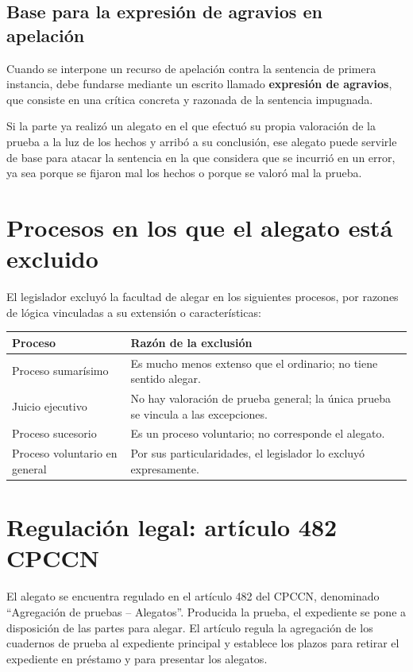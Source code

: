 \documentclass[12pt,oneside]{book}
\begin{document}
\subsection{Base para la expresión de agravios en apelación}

Cuando se interpone un recurso de apelación contra la sentencia de primera instancia, debe fundarse mediante un escrito llamado \textbf{expresión de agravios}, que consiste en una crítica concreta y razonada de la sentencia impugnada.

Si la parte ya realizó un alegato en el que efectuó su propia valoración de la prueba a la luz de los hechos y arribó a su conclusión, ese alegato puede servirle de base para atacar la sentencia en la que considera que se incurrió en un error, ya sea porque se fijaron mal los hechos o porque se valoró mal la prueba.

\section{Procesos en los que el alegato está excluido}

El legislador excluyó la facultad de alegar en los siguientes procesos, por razones de lógica vinculadas a su extensión o características:

\begin{table}[H]
\centering
\begin{tabularx}{\textwidth}{>{\raggedright\arraybackslash}p{4.2cm} >{\raggedright\arraybackslash}X}
\toprule
\textbf{Proceso} & \textbf{Razón de la exclusión} \\
\midrule
Proceso sumarísimo & Es mucho menos extenso que el ordinario; no tiene sentido alegar. \\
Juicio ejecutivo & No hay valoración de prueba general; la única prueba se vincula a las excepciones. \\
Proceso sucesorio & Es un proceso voluntario; no corresponde el alegato. \\
Proceso voluntario en general & Por sus particularidades, el legislador lo excluyó expresamente. \\
\bottomrule
\end{tabularx}
\end{table}

\section{Regulación legal: artículo 482 CPCCN}

El alegato se encuentra regulado en el artículo 482 del CPCCN, denominado ``Agregación de pruebas -- Alegatos''. Producida la prueba, el expediente se pone a disposición de las partes para alegar. El artículo regula la agregación de los cuadernos de prueba al expediente principal y establece los plazos para retirar el expediente en préstamo y para presentar los alegatos.
\end{document}
